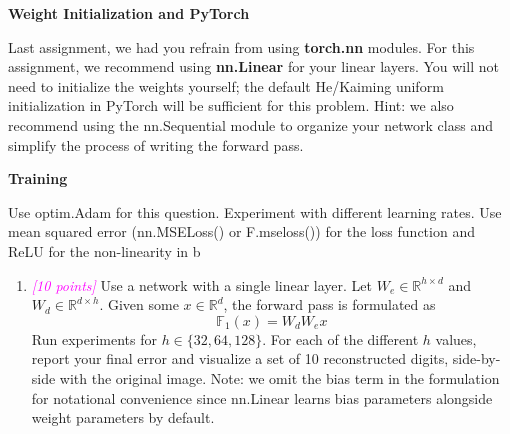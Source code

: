 \documentclass{article}
\newcommand{\field}[1]{\mathbb{#1}}
\newcommand{\1}{\mathbf{1}}
\newcommand{\R}{\field{R}} %
\newcommand{\F}{\field{F}} %
\newcommand{\points}[1]{\small\textcolor{magenta}{\emph{[#1 points]}} \normalsize}
\begin{document}
\textbf{Weight Initialization and PyTorch}

Last assignment, we had you refrain from using \textbf{torch.nn} modules. For this assignment, we recommend using \textbf{nn.Linear} for your linear layers. You will not need to initialize the weights yourself; the default He/Kaiming uniform initialization in PyTorch will be sufficient for this problem. Hint: we also recommend using the nn.Sequential module to organize your network class and simplify the process of writing the forward pass. 

\textbf{Training}

Use optim.Adam for this question. Experiment with different learning rates. Use mean squared error (nn.MSELoss() or F.mseloss()) for the loss function and ReLU for the non-linearity in b

\begin{enumerate}
    \item \points{10} Use a network with a single linear layer. Let $W_e\in\R^{h\times d}$ and $W_d\in\R^{d\times h}$. Given some $x\in\R^d$, the forward pass is formulated as 
    $$\F_1(x) =W_dW_ex$$
    Run experiments for $h\in \{32,64,128\}$. For each of the different $h$ values, report your  final error and visualize a set of 10 reconstructed digits, side-by-side with the original image. Note: we omit the bias term in the formulation for notational convenience since nn.Linear learns bias parameters alongside weight parameters by default. \\
    \begin{figure}[h!]
        \centering 
        \\
        \\

\end{figure}
\end{enumerate}
\end{document}
